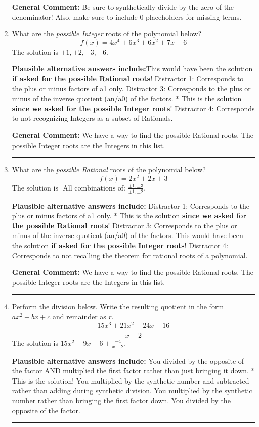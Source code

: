 \documentclass{extbook}[14pt]
\newcommand{\litem}[1]{\item #1

\rule{\textwidth}{0.4pt}}
\begin{document}
\begin{enumerate}
{\textbf{General Comment:} Be sure to synthetically divide by the zero of the denominator! Also, make sure to include 0 placeholders for missing terms.
}
\litem{
What are the \textit{possible Integer} roots of the polynomial below?
\[ f(x) = 4x^{4} +6 x^{3} +6 x^{2} +7 x + 6 \]The solution is \( \pm 1,\pm 2,\pm 3,\pm 6 \).\begin{enumerate}[label=\Alph*.]
\textbf{Plausible alternative answers include:}This would have been the solution \textbf{if asked for the possible Rational roots}!
 Distractor 1: Corresponds to the plus or minus factors of a1 only.
 Distractor 3: Corresponds to the plus or minus of the inverse quotient (an/a0) of the factors. 
* This is the solution \textbf{since we asked for the possible Integer roots}!
 Distractor 4: Corresponds to not recognizing Integers as a subset of Rationals.
\end{enumerate}

\textbf{General Comment:} We have a way to find the possible Rational roots. The possible Integer roots are the Integers in this list.
}
\litem{
What are the \textit{possible Rational} roots of the polynomial below?
\[ f(x) = 2x^{2} +2 x + 3 \]The solution is \( \text{ All combinations of: }\frac{\pm 1,\pm 3}{\pm 1,\pm 2} \).\begin{enumerate}[label=\Alph*.]
\textbf{Plausible alternative answers include:} Distractor 1: Corresponds to the plus or minus factors of a1 only.
* This is the solution \textbf{since we asked for the possible Rational roots}!
 Distractor 3: Corresponds to the plus or minus of the inverse quotient (an/a0) of the factors. 
This would have been the solution \textbf{if asked for the possible Integer roots}!
 Distractor 4: Corresponds to not recalling the theorem for rational roots of a polynomial.
\end{enumerate}

\textbf{General Comment:} We have a way to find the possible Rational roots. The possible Integer roots are the Integers in this list.
}
\litem{
Perform the division below. Write the resulting quotient in the form $ax^2+bx+c$ and remainder as $r$.
\[ \frac{15x^{3} +21 x^{2} -24 x -16}{x + 2} \]The solution is \( 15x^{2} -9 x -6 + \frac{-4}{x + 2} \).\begin{enumerate}[label=\Alph*.]
\textbf{Plausible alternative answers include:} You divided by the opposite of the factor AND multiplied the first factor rather than just bringing it down.
* This is the solution!
 You multiplied by the synthetic number and subtracted rather than adding during synthetic division.
 You multiplied by the synthetic number rather than bringing the first factor down.
 You divided by the opposite of the factor.
\end{enumerate}

}
\end{enumerate}
\end{document}
